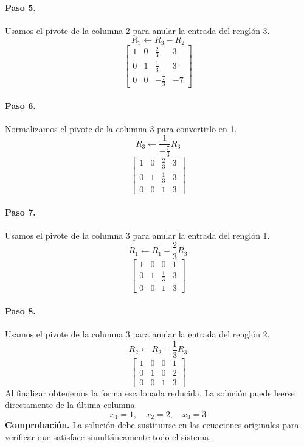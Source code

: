 \documentclass[12pt]{article}
\theoremstyle{remark}
\begin{document}
\paragraph{Paso 5.} Usamos el pivote de la columna 2 para anular la entrada del renglón 3.
\[
R_{3}\leftarrow R_{3}-R_{2}
\]
\[
\left[\begin{array}{ccc|c}
1 & 0 & \frac{2}{3} & 3\\
0 & 1 & \frac{1}{3} & 3\\
0 & 0 & - \frac{7}{3} & -7
\end{array}\right]
\]
\paragraph{Paso 6.} Normalizamos el pivote de la columna 3 para convertirlo en 1.
\[
R_{3}\leftarrow \frac{1}{- \frac{7}{3}}R_{3}
\]
\[
\left[\begin{array}{ccc|c}
1 & 0 & \frac{2}{3} & 3\\
0 & 1 & \frac{1}{3} & 3\\
0 & 0 & 1 & 3
\end{array}\right]
\]
\paragraph{Paso 7.} Usamos el pivote de la columna 3 para anular la entrada del renglón 1.
\[
R_{1}\leftarrow R_{1}-\frac{2}{3}R_{3}
\]
\[
\left[\begin{array}{ccc|c}
1 & 0 & 0 & 1\\
0 & 1 & \frac{1}{3} & 3\\
0 & 0 & 1 & 3
\end{array}\right]
\]
\paragraph{Paso 8.} Usamos el pivote de la columna 3 para anular la entrada del renglón 2.
\[
R_{2}\leftarrow R_{2}-\frac{1}{3}R_{3}
\]
\[
\left[\begin{array}{ccc|c}
1 & 0 & 0 & 1\\
0 & 1 & 0 & 2\\
0 & 0 & 1 & 3
\end{array}\right]
\]
Al finalizar obtenemos la forma escalonada reducida. La solución puede leerse directamente de la última columna.
\[
\boxed{x_{1}=1,\quad x_{2}=2,\quad x_{3}=3}
\]
\textbf{Comprobación.} La solución debe sustituirse en las ecuaciones originales para verificar que satisface simultáneamente todo el sistema.
\end{document}
